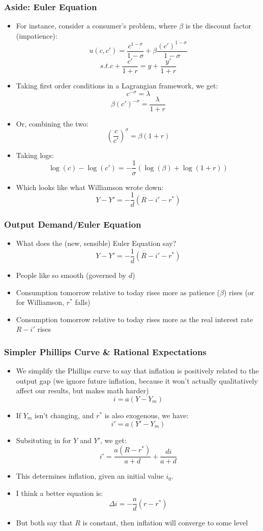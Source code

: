 \documentclass{beamer}
\begin{document}
\begin{frame}
\frametitle[alignment=center]{Aside: Euler Equation}
\footnotesize
\begin{itemize}
\item For instance, consider a consumer's problem, where $\beta$ is the discount factor (impatience):
$$u(c,c')=\frac{c^{1-\sigma}}{1-\sigma}+\beta\frac{(c')^{1-\sigma}}{1-\sigma}$$
$$s.t. c+\frac{c'}{1+r}=y+\frac{y'}{1+r}$$
\item Taking first order conditions in a Lagrangian framework, we get:
$$c^{-\sigma}=\lambda$$
$$\beta(c')^{-\sigma}=\frac{\lambda}{1+r}$$
\item Or, combining the two:
$$\left(\frac{c}{c'}\right)^{\sigma}=\beta(1+r)$$
\item Taking logs:
$$\log(c)-\log(c')=-\frac{1}{\sigma}\left(\log(\beta)+\log(1+r)\right)$$
\item Which looks like what Williamson wrote down:
$$Y-Y'=-\frac{1}{d}(R-i'-r^*)$$
\end{itemize}
\end{frame}

\begin{frame}
\frametitle[alignment=center]{Output Demand/Euler Equation}
\footnotesize
\begin{itemize}
\item What does the (new, sensible) Euler Equation say?
$$Y-Y'=-\frac{1}{d}(R-i'-r^*)$$
\item People like so smooth (governed by $d$)
\bigskip
\item Consumption tomorrow relative to today rises more as patience ($\beta$) rises (or for Williamson, $r^*$ falls)
\bigskip
\item Consumption tomorrow relative to today rises more as the real interest rate $R-i'$ rises
\end{itemize}
\end{frame}


\begin{frame}
\frametitle[alignment=center]{Simpler Phillips Curve \& Rational Expectations}
\footnotesize
\begin{itemize}
\item We simplify the Phillips curve to say that inflation is positively related to the output gap (we ignore future inflation, because it won't actually qualitatively affect our results, but makes math harder)
$$i=a(Y-Y_m)$$
\bigskip
\item If $Y_m$ isn't changing, and $r^*$ is also exogenous, we have:
$$i'=a(Y'-Y_m)$$
\item Subsituting in for $Y$ and $Y'$, we get:
$$i'=\frac{a(R-r^*)}{a+d}+\frac{di}{a+d}$$
\item This determines inflation, given an initial value $i_0$.
\bigskip
\item I think a better equation is:
$$\Delta i =-\frac{a}{d}\left(r-r^*\right)$$
\bigskip
\item But both say that $R$ is constant, then inflation will converge to some level
\end{itemize}
\end{frame}
\end{document}
